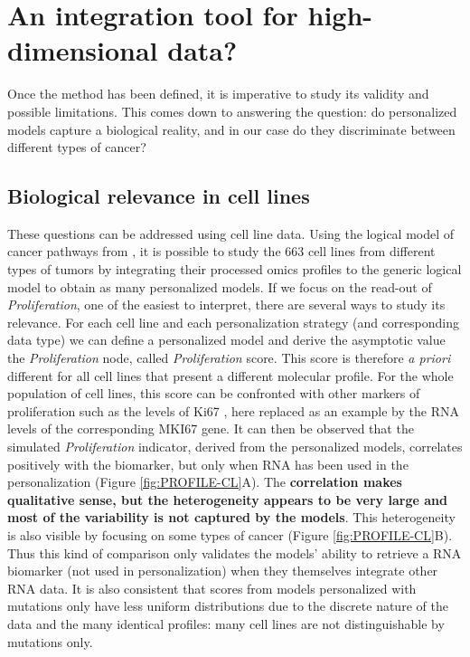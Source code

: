 \documentclass[a4paper,12pt,twoside,onecolumn,openright,final,oldfontcommands]{memoir}
\begin{document}
\section{An integration tool for high-dimensional
data?}\label{an-integration-tool-for-high-dimensional-data}

Once the method has been defined, it is imperative to study its validity
and possible limitations. This comes down to answering the question: do
personalized models capture a biological reality, and in our case do
they discriminate between different types of cancer?

\subsection{Biological relevance in cell lines}\label{PROFILE-CL}

These questions can be addressed using cell line data. Using the logical
model of cancer pathways from \citet{fumia2013boolean}, it is possible
to study the 663 cell lines from different types of tumors by
integrating their processed omics profiles to the generic logical model
to obtain as many personalized models. If we focus on the read-out of
\emph{Proliferation}, one of the easiest to interpret, there are several
ways to study its relevance. For each cell line and each personalization
strategy (and corresponding data type) we can define a personalized
model and derive the asymptotic value the \emph{Proliferation} node,
called \emph{Proliferation} score. This score is therefore \emph{a
priori} different for all cell lines that present a different molecular
profile. For the whole population of cell lines, this score can be
confronted with other markers of proliferation such as the levels of
Ki67 \citep{miller2018ki67}, here replaced as an example by the RNA
levels of the corresponding MKI67 gene. It can then be observed that the
simulated \emph{Proliferation} indicator, derived from the personalized
models, correlates positively with the biomarker, but only when RNA has
been used in the personalization (Figure \ref{fig:PROFILE-CL}A). The
\textbf{correlation makes qualitative sense, but the heterogeneity
appears to be very large and most of the variability is not captured by
the models}. This heterogeneity is also visible by focusing on some
types of cancer (Figure \ref{fig:PROFILE-CL}B). Thus this kind of
comparison only validates the models' ability to retrieve a RNA
biomarker (not used in personalization) when they themselves integrate
other RNA data. It is also consistent that scores from models
personalized with mutations only have less uniform distributions due to
the discrete nature of the data and the many identical profiles: many
cell lines are not distinguishable by mutations only.
\end{document}
